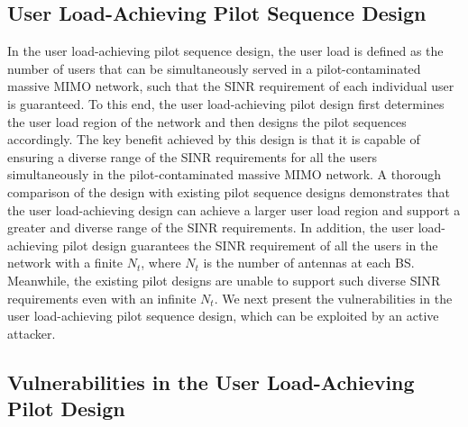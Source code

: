 \documentclass[conference]{IEEEtran}
\begin{document}
\subsection{User Load-Achieving Pilot Sequence Design}

In the user load-achieving pilot sequence design, the user load is defined as the number of users that can be simultaneously served in a pilot-contaminated massive MIMO network, such that the SINR requirement of each individual user is guaranteed. To this end, the user load-achieving pilot design first determines the user load region of the network and then designs the pilot sequences accordingly. The key benefit achieved by this design is that it is capable of ensuring a diverse range of the SINR requirements for all the users simultaneously in the pilot-contaminated massive MIMO network. A thorough comparison of the design with existing pilot sequence designs demonstrates that the user load-achieving design can achieve a larger user load region and support a greater and diverse range of the SINR requirements. In addition, the user load-achieving pilot design guarantees the SINR requirement of all the users in the network with a finite $N_{t}$, where $N_{t}$ is the number of antennas at each BS. Meanwhile, the existing pilot designs are unable to support such diverse SINR requirements even with an infinite $N_{t}$. We next present the vulnerabilities in the user load-achieving pilot sequence design, which can be exploited by an active attacker.

\subsection{Vulnerabilities in the User Load-Achieving Pilot Design}
\end{document}
